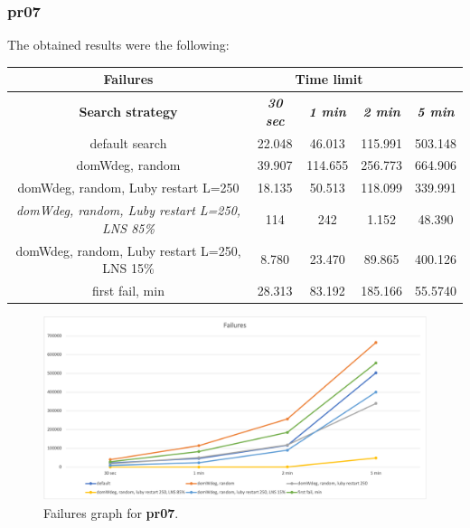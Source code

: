 \subsubsection{pr07}
The obtained results were the following:
{
\renewcommand{\arraystretch}{2}
\begin{longtable}[h]{| c | c | c | c | c |}
    \hline
    \textbf{Failures} & \multicolumn{3}{c}{Time limit} & \\
    \hline
    \textbf{Search strategy} & \textbf{\textit{30 sec}} & \textbf{\textit{1 min}} & \textbf{\textit{2 min}} & \textbf{\textit{5 min}} \\
    \hline
    \endhead
    default search                                         & 22.048 &  46.013 & 115.991 & 503.148 \\
    \hline
    domWdeg, random                                        & 39.907 & 114.655 & 256.773 & 664.906 \\
    \hline
    domWdeg, random, Luby restart L=250                    & 18.135 &  50.513 & 118.099 & 339.991 \\
    \hline
    \textit{domWdeg, random, Luby restart L=250, LNS 85\%} &   114 &    242 &   1.152 &  48.390 \\
    \hline
    domWdeg, random, Luby restart L=250, LNS 15\%          &  8.780 &  23.470 &  89.865 & 400.126 \\
    \hline
    first fail, min                                        & 28.313 &  83.192 & 185.166 & 55.5740 \\
    \hline
\end{longtable}
}
\begin{figure}[H]
    \centering
    \includegraphics[width=0.8\columnwidth]{../graphs/pr07-failures.png}
    \caption{Failures graph for \textbf{pr07}.}
\end{figure}

